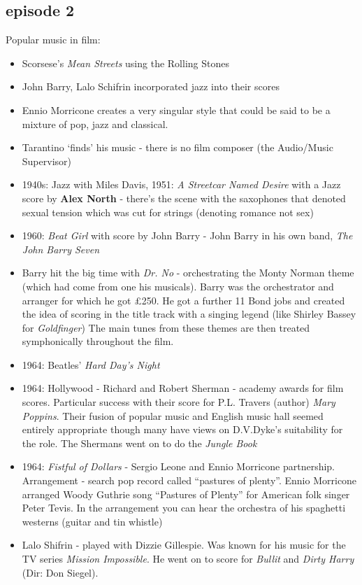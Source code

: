 \subsection{episode 2}
Popular music in film:
\begin{itemize}
\item Scorsese's \textit{Mean Streets} using the Rolling Stones
\item John Barry, Lalo Schifrin incorporated jazz into their scores
\item Ennio Morricone creates a very singular style that could be said to be a mixture of pop, jazz and classical.
\item Tarantino `finds' his music - there is no film composer (the Audio/Music Supervisor)
\item 1940s: Jazz with Miles Davis, 1951: \textit{A Streetcar Named Desire} with a Jazz score by \textbf{Alex North} - there's the scene with the saxophones that denoted sexual tension which was cut for strings (denoting romance not sex)
\item 1960: \textit{Beat Girl} with score by John Barry - John Barry in his own band, \textit{The John Barry Seven}
\item Barry hit the big time with \textit{Dr. No} - orchestrating the Monty Norman theme (which had come from one his musicals). Barry was the orchestrator and arranger for which he got £250. He got a further 11 Bond jobs and created the idea of scoring in the title track with a singing legend (like Shirley Bassey for \textit{Goldfinger}) The main tunes from these themes are then treated symphonically throughout the film.
\item 1964: Beatles' \textit{Hard Day's Night}
\item 1964: Hollywood - Richard and Robert Sherman - academy awards for film scores. Particular success with their score for P.L. Travers (author) \textit{Mary Poppins}. Their fusion of popular music and English music hall seemed entirely appropriate though many have views on D.V.Dyke's suitability for the role. The Shermans went on to do the \textit{Jungle Book}
\item 1964: \textit{Fistful of Dollars} - Sergio Leone and Ennio Morricone partnership. Arrangement - search pop record called ``pastures of plenty''. Ennio Morricone arranged Woody Guthrie song ``Pastures of Plenty'' for American folk singer Peter Tevis. In the arrangement you can hear the orchestra of his spaghetti westerns (guitar and tin whistle) 
\item Lalo Shifrin - played with Dizzie Gillespie. Was known for his music for the TV series \textit{Mission Impossible}. He went on to score for \textit{Bullit} and \textit{Dirty Harry} (Dir: Don Siegel). 

\end{itemize}
